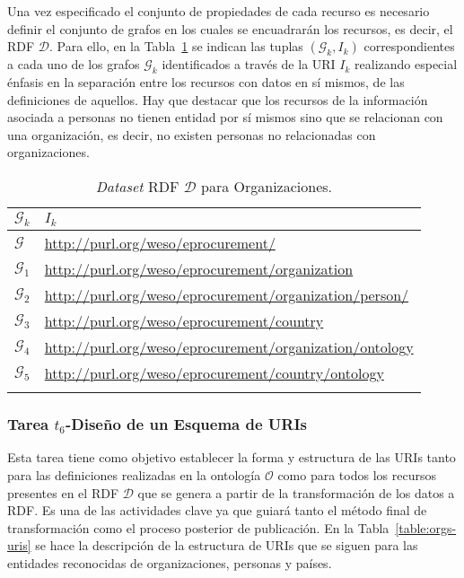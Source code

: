 Una vez especificado el conjunto de propiedades de cada recurso es necesario definir el conjunto 
de grafos en los cuales se encuadrarán los recursos, es decir, el \dataset \gls{RDF} $\mathcal{D}$. Para ello, 
en la Tabla~\ref{table:orgs-dataset} se indican las tuplas $(\mathcal{G}_k, I_k)$ correspondientes a cada uno 
de los grafos $\mathcal{G}_k$ identificados a través de la \gls{URI} $I_k$ realizando especial énfasis en la separación 
entre los recursos con datos en sí mismos, de las definiciones de aquellos. Hay que destacar que los recursos 
de la información asociada a personas no tienen entidad por sí mismos sino que se relacionan con una organización, es decir, 
no existen personas no relacionadas con organizaciones.

\begin{longtable}[c]{|p{3cm}|p{9cm}|} 
\hline
  \textbf{$\mathcal{G}_k$} &  \textbf{$I_k$}  \\\hline
\endhead
 \textbf{$\mathcal{G}$}     & \url{http://purl.org/weso/eprocurement/} \\ \hline
 \textbf{$\mathcal{G}_{1}$} & \url{http://purl.org/weso/eprocurement/organization} \\ \hline
 \textbf{$\mathcal{G}_{2}$} & \url{http://purl.org/weso/eprocurement/organization/person/} \\ \hline
 \textbf{$\mathcal{G}_{3}$} & \url{http://purl.org/weso/eprocurement/country} \\ \hline
 \textbf{$\mathcal{G}_{4}$} & \url{http://purl.org/weso/eprocurement/organization/ontology} \\ \hline
 \textbf{$\mathcal{G}_{5}$} & \url{http://purl.org/weso/eprocurement/country/ontology} \\ \hline 
\hline
\caption{\textit{Dataset} RDF $\mathcal{D}$ para Organizaciones.}\label{table:orgs-dataset}\\    
\end{longtable}


\subsubsection{Tarea $t_6$-Diseño de un Esquema de URIs}
Esta tarea tiene como objetivo establecer la forma y estructura de las \gls{URI}s tanto para las definiciones 
realizadas en la ontología $\mathcal{O}$ como para todos los recursos presentes en el \dataset RDF $\mathcal{D}$ que 
se genera a partir de la transformación de los datos a \gls{RDF}. Es una de las actividades clave ya que guiará 
tanto el método final de transformación como el proceso posterior de publicación. En la Tabla~\ref{table:orgs-uris} se 
hace la descripción de la estructura de URIs que se siguen para las entidades reconocidas de organizaciones, personas y países.

